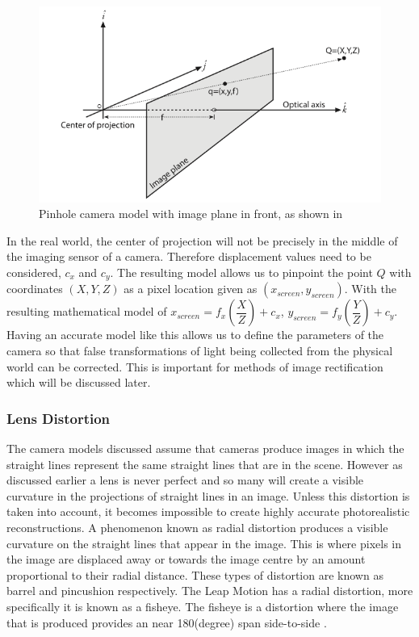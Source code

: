 \documentclass[11pt,oneside]{report}
\begin{document}
				\begin{figure}[!ht]
				\begin{center}
					\includegraphics[scale=0.5]{pinhole2}
					\caption{Pinhole camera model with image plane in front, as shown in \protect{} {\label{pinhole2}}}
				\end{center}
				\end{figure}
				In the real world, the center of projection will not be precisely in the middle of the imaging sensor of a camera.
				Therefore displacement values need to be considered, $c_{x}$ and $c_{y}$.
				The resulting model allows us to pinpoint the point $Q$ with coordinates $(X,Y,Z)$ as a pixel location given as $(x_{screen}, y_{screen})$.
				With the resulting mathematical model of $x_{screen}=f_{x}\left(\dfrac{X}{Z}\right)+c_{x}$, $y_{screen}=f_{y}\left(\dfrac{Y}{Z}\right)+c_{y}$.
				Having an accurate model like this allows us to define the parameters of the camera so that false transformations of light being collected from the physical world can be corrected.
				This is important for methods of image rectification which will be discussed later.
				\subsubsection{Lens Distortion}
					The camera models discussed assume that cameras produce images in which the straight lines represent the same straight lines that are in the scene.
					However as discussed earlier a lens is never perfect and so many will create a visible curvature in the projections of straight lines in an image.
					Unless this distortion is taken into account, it becomes impossible to create highly accurate photorealistic reconstructions.
					A phenomenon known as radial distortion produces a visible curvature on the straight lines that appear in the image.
					This is where pixels in the image are displaced away or towards the image centre by an amount proportional to their radial distance.
					These types of distortion are known as barrel and pincushion respectively.
					The Leap Motion has a radial distortion, more specifically it is known as a fisheye.
					The fisheye is a distortion where the image that is produced provides an near 180(degree) span side-to-side \cite{book:sam}.
					
\end{document}
